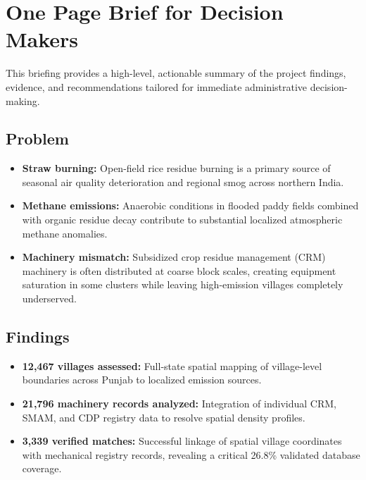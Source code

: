 \documentclass[12pt,a4paper]{report}
\begin{document}
\chapter*{One Page Brief for Decision Makers}
This briefing provides a high-level, actionable summary of the project findings, evidence, and recommendations tailored for immediate administrative decision-making.

\section*{Problem}
\begin{itemize}
    \item \textbf{Straw burning:} Open-field rice residue burning is a primary source of seasonal air quality deterioration and regional smog across northern India.
    \item \textbf{Methane emissions:} Anaerobic conditions in flooded paddy fields combined with organic residue decay contribute to substantial localized atmospheric methane anomalies.
    \item \textbf{Machinery mismatch:} Subsidized crop residue management (CRM) machinery is often distributed at coarse block scales, creating equipment saturation in some clusters while leaving high-emission villages completely underserved.
\end{itemize}

\section*{Findings}
\begin{itemize}
    \item \textbf{12,467 villages assessed:} Full-state spatial mapping of village-level boundaries across Punjab to localized emission sources.
    \item \textbf{21,796 machinery records analyzed:} Integration of individual CRM, SMAM, and CDP registry data to resolve spatial density profiles.
    \item \textbf{3,339 verified matches:} Successful linkage of spatial village coordinates with mechanical registry records, revealing a critical 26.8\% validated database coverage.
\end{itemize}
\end{document}
